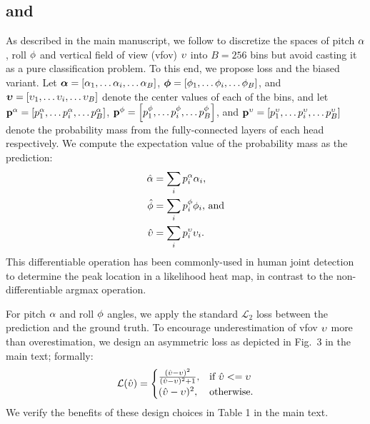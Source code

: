 \documentclass[10pt,twocolumn,letterpaper,usenames,dvipsnames]{article}
\begin{document}
\subsection{\softltwo and \softbiasedltwo}
As described in the main manuscript, we follow \cite{zhu2020single} to discretize the spaces of pitch $\alpha$, roll $\phi$ and vertical field of view (vfov) $\upsilon$ into $B=256$ bins  but avoid casting it as a pure classification problem.
To this end, we propose \softltwo loss and the biased variant.
Let
$\mathbf{\boldsymbol{\alpha}}=\left [ \alpha_1, \dots \alpha_i, \dots \alpha_B \right]$,
$\mathbf{\boldsymbol{\phi}}=\left [ \phi_1, \dots \phi_i, \dots \phi_B \right]$, and 
$\mathbf{\boldsymbol{\upsilon}}=\left [ \upsilon_1, \dots \upsilon_i, \dots \upsilon_B \right]$ denote the center values of each of the bins, 
and let 
$\mathbf{p^{\alpha}}=\left [ p_1^{\alpha}, \dots p_i^{\alpha}, \dots p_B^{\alpha} \right]$,
$\mathbf{p^{\phi}}=\left [ p_1^{\phi}, \dots p_i^{\phi}, \dots p_B^{\phi} \right]$, and
$\mathbf{p^{\upsilon}}=\left [ p_1^{\upsilon}, \dots p_i^{\upsilon}, \dots p_B^{\upsilon} \right]$ 
denote the probability mass from the fully-connected layers of each head respectively.
We compute the expectation value of the probability mass as the prediction:
\begin{equation}
\begin{split}
    \hat{\alpha} &= \sum_i p_i^{\alpha} \alpha_i\text{,}  \\ 
    \hat{\phi} &= \sum_i p_i^{\phi} \phi_i \text{, and} \\ 
    \hat{\upsilon} &= \sum_i p_i^{\upsilon} \upsilon_i. \\ 
\end{split}
\end{equation}
This differentiable operation has been commonly-used in human joint detection \cite{luvizon2019human,sun2018integral} 
to determine the peak location in a likelihood heat map, in contrast to the non-differentiable argmax operation.

For pitch $\alpha$ and roll $\phi$ angles, we apply the standard $\mathcal{L}_2$ loss between the prediction and the ground truth. 
To encourage underestimation of vfov $\upsilon$ more than overestimation, 
we design an asymmetric loss as depicted in Fig.~3 in the main text; formally:
\begin{equation}
\label{eq-softbiasedltwo}
\mathcal{L}(\hat{\upsilon})=
    \begin{cases}
       \frac{(\hat{\upsilon} - \upsilon)^2}{(\hat{\upsilon} - \upsilon)^2+ 1}, & \text{if}\ \hat{\upsilon} <= \upsilon \\
      (\hat{\upsilon} - \upsilon)^2, & \text{otherwise.}
    \end{cases}
\end{equation}
We verify the benefits of these design choices in Table 1 in the main text.
\end{document}
